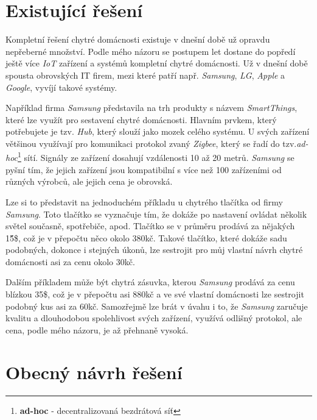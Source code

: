 \section*{Existující řešení}
\label{navrh:existujici}

Kompletní řešení chytré domácnosti existuje v dnešní době už opravdu nepřeberné množství. Podle mého názoru se postupem let dostane do popředí ještě více \emph{IoT} zařízení a systémů kompletní chytré domácnosti.
Už v dnešní době spousta obrovských IT firem, mezi které patří např. \emph{Samsung}, \emph{LG}, \emph{Apple} a \emph{Google}, vyvíjí takové systémy.

Například firma \emph{Samsung} představila na trh produkty s názvem \emph{SmartThings}, které lze využít pro sestavení chytré domácnosti.
Hlavním prvkem, který potřebujete je tzv. \emph{Hub}, který slouží jako mozek celého systému.
U svých zařízení většinou využívají pro komunikaci protokol zvaný \emph{Zigbee}, který se řadí do tzv.\emph{ad-hoc}\footnote{\textbf{ad-hoc} - decentralizovaná bezdrátová síť} sítí.
Signály ze zařízení dosahují vzdálenosti 10 až 20 metrů.
\emph{Samsung} se pyšní tím, že jejich zařízení jsou kompatibilní s více než 100 zařízeními od různých výrobců, ale jejich cena je obrovská.

Lze si to představit na jednoduchém příkladu u chytrého tlačítka od firmy \emph{Samsung}. Toto tlačítko se vyznačuje tím, že dokáže po nastavení ovládat několik světel současně, spotřebiče, apod.
Tlačítko se v průměru prodává za nějakých 15̈́\$, což je v přepočtu něco okolo 380kč. Takové tlačítko, které dokáže sadu podobných, dokonce i stejných úkonů, lze sestrojit pro můj vlastní návrh chytré domácnosti asi za cenu okolo 30kč.

Dalším příkladem může být chytrá zásuvka, kterou \emph{Samsung} prodává za cenu blízkou 35\$, což je v přepočtu asi 880kč a ve své vlastní domácnosti lze sestrojit podobný kus asi za 60kč.
Samozřejmě lze brát v úvahu i to, že \emph{Samsung} zaručuje kvalitu a dlouhodobou spolehlivost svých zařízení, využívá odlišný protokol, ale cena, podle mého názoru, je až přehnaně vysoká.

\newpage

\section*{Obecný návrh řešení}
\label{navrh:reseni}


